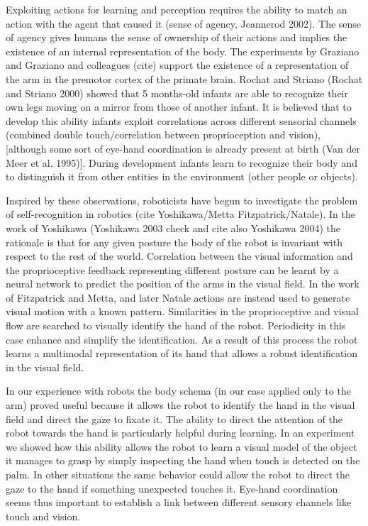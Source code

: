 Exploiting actions for learning and perception requires the ability to match an action with the agent that caused it (sense of agency, Jeannerod 2002). The sense of agency gives humans the sense of ownership of their actions and implies the existence of an internal representation of the body. The experiments by Graziano and Graziano and colleagues (cite) support the existence of a representation of the arm in the premotor cortex of the primate brain. Rochat and Striano (Rochat and Striano 2000) showed that 5 months-old infants are able to recognize their own legs moving on a mirror from those of another infant. It is believed that to develop this ability infants exploit correlations across different sensorial channels (combined double touch/correlation between proprioception and vision), [although some sort of eye-hand coordination is already present at birth (Van der Meer et al. 1995)]. During development infants learn to recognize their body and to distinguish it from other entities in the environment (other people or objects). 

Inspired by these observations, roboticists have begun to investigate the problem of self-recognition in robotics (cite Yoshikawa/Metta Fitzpatrick/Natale). In the work of Yoshikawa (Yoshikawa 2003 check and cite also Yoshikawa 2004) the rationale is that for any given posture the body of the robot is invariant with respect to the rest of the world. Correlation between the visual information and the proprioceptive feedback representing different posture can be learnt by a neural network to predict the position of the arms in the visual field. In the work of Fitzpatrick and Metta, and later Natale actions are instead used to generate visual motion with a known pattern. Similarities in the proprioceptive and visual flow are searched to visually identify the hand of the robot. Periodicity in this case enhance and simplify the identification. As a result of this process the robot learns a multimodal representation of its hand that allows a robust identification in the visual field.

In our experience with robots the body schema (in our case applied only to the arm) proved useful because it allows the robot to identify the hand in the visual field and direct the gaze to fixate it. The ability to direct the attention of the robot towards the hand is particularly helpful during learning. In an experiment we showed how this ability allows the robot to learn a visual model of the object it manages to grasp by simply inspecting the hand when touch is detected on the palm. In other situations the same behavior could allow the robot to direct the gaze to the hand if something unexpected touches it. Eye-hand coordination seems thus important to establish a link between different sensory channels like touch and vision.